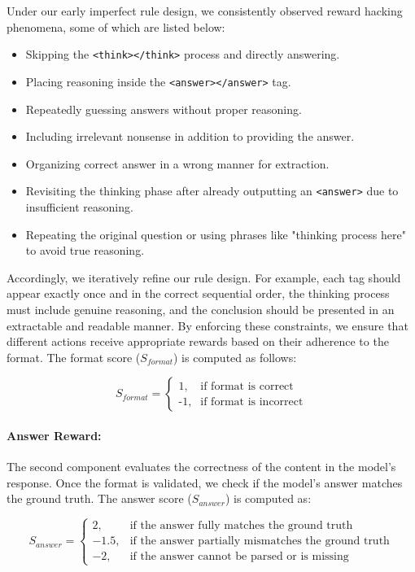 Under our early imperfect  rule design, we consistently observed  reward hacking phenomena, some of which are listed below:

\begin{itemize}[leftmargin=*]
    \item Skipping the \texttt{<think></think>} process and directly answering.
    \item Placing reasoning inside the \texttt{<answer></answer>} tag.
    \item Repeatedly guessing answers without proper reasoning.
    \item Including irrelevant nonsense in addition to providing the answer.
    \item Organizing correct answer in a wrong manner for extraction.
    \item Revisiting the thinking phase after already outputting an \texttt{<answer>} due to insufficient reasoning.
    \item Repeating the original question or using phrases like "thinking process here" to avoid true reasoning.
\end{itemize}

Accordingly, we iteratively refine our rule design. For example, each tag should appear exactly once and in the correct sequential order, the thinking process must include genuine reasoning, and the conclusion should be presented in an extractable and readable manner. By enforcing these constraints, we ensure that different actions receive appropriate rewards based on their adherence to the format. The format score (\( S_{format} \)) is computed as follows:

\[
S_{format} =
\begin{cases}
\text{1}, & \text{if format is correct} \\
\text{-1}, & \text{if format is incorrect}
\end{cases}
\]


\paragraph{Answer Reward:} The second component evaluates the correctness of the content in the model’s response. Once the format is validated, we check if the model's answer matches the ground truth. The answer score (\( S_{answer} \)) is computed as:

\[
S_{answer} =
\begin{cases}
2, & \text{if the answer fully matches the ground truth} \\
-1.5, & \text{if the answer partially mismatches the ground truth} \\
-2, & \text{if the answer cannot be parsed or is missing}
\end{cases}
\]

